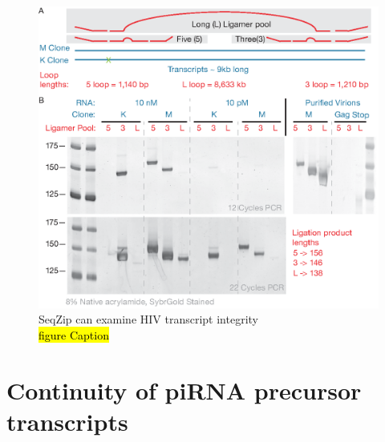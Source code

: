 \begin{figure}[htbp]
	\centering 
	\includegraphics{Figures/Chapter2/HIVviaSeqZip.eps}
	\caption[SeqZip can examine HIV transcript integrity]
	{
		SeqZip can examine HIV transcript integrity\\
		\hl{figure Caption}
	}
	\label{fig:Hiv tx via SeqZip}
\end{figure}

\section{Continuity of piRNA precursor transcripts}\label{sec: piRNA Precursor SeqZip analysis}

